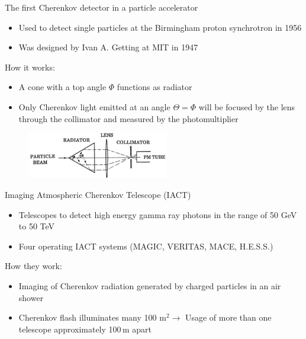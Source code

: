 \documentclass[aspectratio=1610, 10pt]{beamer}
\begin{document}
\begin{frame}{The first Cherenkov detector in a particle accelerator}
  \begin{itemize}
    \item Used to detect single particles at the Birmingham proton synchrotron in 1956
    \medskip
    \item Was designed by Ivan A. Getting at MIT in 1947
  \end{itemize}

How it works:
\begin{itemize}
  \item A cone with a top angle $\Phi$ functions as radiator
  \medskip
  \item Only Cherenkov light emitted at an angle $\Theta = \Phi$ will be focused by the lens through the collimator and measured by the
  photomultiplier
\end{itemize}
\begin{figure}
  \includegraphics[width=0.55\textwidth]{images/the_second.png}
\end{figure}
\end{frame}


\begin{frame}{Imaging Atmospheric Cherenkov Telescope (IACT)}
  \begin{itemize}
    \item Telescopes to detect high energy gamma ray photons in the range of 50 GeV to 50 TeV
    \medskip
    \item Four operating IACT systems (MAGIC, VERITAS, MACE, H.E.S.S.)
  \end{itemize}
\vspace{0.5cm}
How they work:
\begin{itemize}
  \item Imaging of Cherenkov radiation generated by charged particles in an air shower
  \medskip
  \item Cherenkov flash illuminates many 100 $\mathrm{m}^2 \rightarrow$ Usage of more than one telescope approximately 100$\, \mathrm{m}$ apart 
\end{itemize}
\end{frame}
\end{document}
